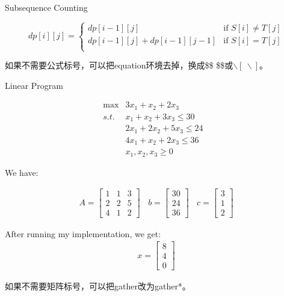\documentclass[a4paper,12pt]{article}
\begin{document}
Subsequence Counting

\begin{equation}
dp[i][j]=
\begin{cases}
dp[i-1][j] & \text{if $S[i]\neq T[j]$}\\
dp[i-1][j]+dp[i-1][j-1] & \text{if $S[i]=T[j]$}\\
\end{cases}
\end{equation}

如果不需要公式标号，可以把equation环境去掉，换成\$\$ \$\$或$\backslash[~\backslash]$。

Linear Program

\begin{equation}
\begin{array}{rrrrrrrrl}
 \max & 3x_1 + x_2 + 2x_3&   \\
 s.t. & x_1 + x_2 + 3x_3 \leq 30 &  \\
      & 2x_1 + 2x_2 + 5x_3 \leq 24 & \\
      & 4x_1 + x_2 + 2x_3 \leq 36 & \\
      & x_1, x_2, x_3 \geq 0
\end{array}
\end{equation}

We have:

\begin{gather}
A=\begin{bmatrix}
1 & 1 & 3\\
2 & 2 & 5\\
4 & 1 & 2
\end{bmatrix}~~~~
b=\begin{bmatrix}
30\\
24\\
36
\end{bmatrix}~~~~
c=\begin{bmatrix}
3\\
1\\
2
\end{bmatrix}
\end{gather}

After running my implementation, we get:
\begin{gather}
x=\begin{bmatrix}
8\\
4\\
0
\end{bmatrix}
\end{gather}

如果不需要矩阵标号，可以把gather改为gather*。
\end{document}
